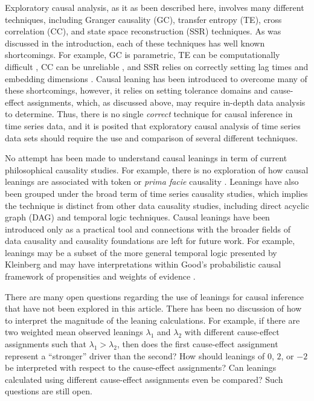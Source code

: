 \documentclass[twocolumn,aps,pre,groupedaddress]{revtex4-1}
\begin{document}
Exploratory causal analysis, as it as been described here, involves many different techniques, including Granger causality (GC), transfer entropy (TE), cross correlation (CC), and state space reconstruction (SSR) techniques.  As was discussed in the introduction, each of these techniques has well known shortcomings.  For example, GC is parametric, TE can be computationally difficult \cite{kaiser2002}, CC can be unreliable \cite{Rogosa1980}, and SSR relies on correctly setting lag times and embedding dimensions \cite{Small2004}.  Causal leaning has been introduced to overcome many of these shortcomings, however, it relies on setting tolerance domains and cause-effect assignments, which, as discussed above, may require in-depth data analysis to determine.  Thus, there is no single {\em correct} technique for causal inference in time series data, and it is posited that exploratory causal analysis of time series data sets should require the use and comparison of several different techniques.

No attempt has been made to understand causal leanings in term of current philosophical causality studies.   For example, there is no exploration of how causal leanings are associated with token or {\em prima facie} causality \cite{kleinberg2012}.  Leanings have also been grouped under the broad term of time series causality studies, which implies the technique is distinct from other data causality studies, including direct acyclic graph (DAG) \cite{Pearl2000} and temporal logic \cite{kleinberg2012} techniques.  Causal leanings have been introduced only as a practical tool and connections with the broader fields of data causality and causality foundations are left for future work.  For example, leanings may be a subset of the more general temporal logic presented by Kleinberg \cite{kleinberg2012} and may have interpretations within Good's probabilistic causal framework of propensities and weights of evidence \cite{Good1984}.

There are many open questions regarding the use of leanings for causal inference that have not been explored in this article.  There has been no discussion of how to interpret the magnitude of the leaning calculations.  For example, if there are two weighted mean observed leanings $\lambda_1$ and $\lambda_2$ with different cause-effect assignments such that $\lambda_1 > \lambda_2$, then does the first cause-effect assignment represent a ``stronger'' driver than the second?  How should leanings of $0$, $2$, or $-2$ be interpreted with respect to the cause-effect assignments?  Can leanings calculated using different cause-effect assignments even be compared?  Such questions are still open.
\end{document}
